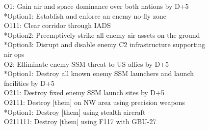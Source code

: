 \begin{figure}[tb]
\begin{scriptsize} %
\begin{center}
\begin{minipage}{3.5in}
O1: Gain air and space dominance over both nations by D+5\\
\hspace*{2ex}  *Option1: Establish and enforce an enemy no-fly zone\\
\hspace*{2ex}\hspace*{2ex}              O111: Clear corridor through IADS\\
\hspace*{2ex}  *Option2: Preemptively strike all enemy air assets on the ground\\
\hspace*{2ex}  *Option3: Disrupt and disable enemy C2 infrastructure supporting air ops\\
O2: Elliminate enemy SSM threat to US allies by D+5\\
\hspace*{2ex}  *Option1: Destroy all known enemy SSM launchers and launch facilities by D+5\\
\hspace*{2ex}\hspace*{2ex}              O211: Destroy fixed enemy SSM launch sites by D+5\\
\hspace*{2ex}\hspace*{2ex}\hspace*{2ex}                     O2111: Destroy [them] on NW area using precision weapons\\
\hspace*{2ex}\hspace*{2ex}\hspace*{2ex}\hspace*{2ex}                     	*Option1: Destroy [them] using stealth aircraft\\
\hspace*{2ex}\hspace*{2ex}\hspace*{2ex}\hspace*{2ex}\hspace*{2ex}                     	      O211111: Destroy [them] using F117 with GBU-27\\

\end{minipage}
\end{center}
\end{scriptsize}
\end{figure}
